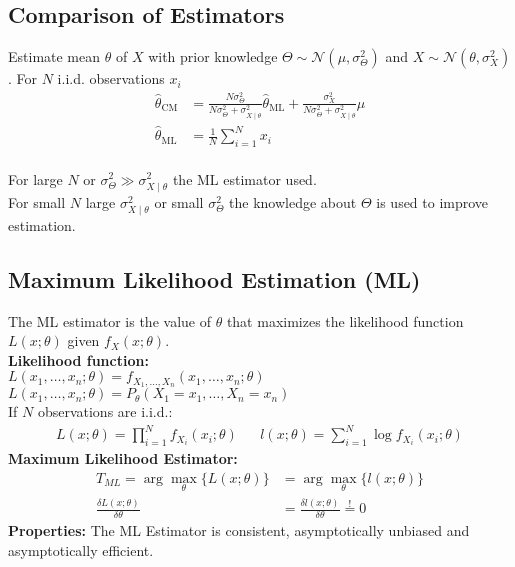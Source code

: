 \begin{mdframed}[style=eqbox]
  \subsection{Comparison of Estimators}
  Estimate mean $\theta$ of $X$ with prior knowledge $\Theta \sim \mathcal{N}(\mu, \sigma_\Theta^2)$ and $X \sim \mathcal{N}(\theta, \sigma_X^2)$. For $N$ i.i.d. observations $x_i$
  \vspace*{-4pt}
  \begin{align*}
    \hat{\theta}_\text{CM} &= \frac{N \sigma_\Theta^2}{N \sigma_\Theta^2 + \sigma_{X\mid\theta}^2} \hat{\theta}_{\text{ML}} + \frac{\sigma_X^2}{N \sigma_\Theta^2 + \sigma_{X\mid\theta}^2} \mu\\[ -4pt]
    \hat{\theta}_\text{ML} &= \frac{1}{N} \sum_{i=1}^N x_i
  \end{align*}\vspace*{-12pt}\\
  For large $N$ or $\sigma_\Theta^2 \gg \sigma_{X\mid\theta}^2$ the ML estimator used.\\
  For small $N$ large $\sigma_{X\mid\theta}^2$ or small $\sigma_\Theta^2$ the knowledge about $\Theta$ is used to improve estimation.
\end{mdframed}
\begin{mdframed}[style=eqbox]
  \subsection{Maximum Likelihood Estimation (ML)}
  The ML estimator is the value of $\theta$ that maximizes the likelihood function $L(x;\theta)$ given $f_X(x; \theta)$.\\[0.25em]
  \textbf{Likelihood function:}\\
  $L(x_1, \ldots, x_n; \theta) = f_{X_1, \ldots, X_n}(x_1, \ldots, x_n; \theta)$\\
  $L(x_1, \ldots, x_n; \theta) = P_\theta(X_1 = x_1, \ldots, X_n = x_n)$\\[0.5em]
  If $N$ observations are i.i.d.:
  \vspace*{-4pt}
  \begin{align*}
    L(x;\theta) = \prod_{i=1}^N f_{X_i}(x_i; \theta) && l(x;\theta) = \sum_{i=1}^N \log f_{X_i}(x_i; \theta)
  \end{align*}
  \textbf{Maximum Likelihood Estimator:}
  \vspace*{-4pt}
  \begin{align*}
    T_{ML} = \arg \max_\theta \{ L(x;\theta) \} &= \arg\max_\theta \{ l(x;\theta)\}\\
    \frac{\delta L(x;\theta)}{\delta \theta} &= \frac{\delta l(x;\theta)}{\delta \theta} \overset{!}{ =} 0
  \end{align*}
  \textbf{Properties:}
  The ML Estimator is consistent, asymptotically unbiased and asymptotically efficient.
\end{mdframed}
